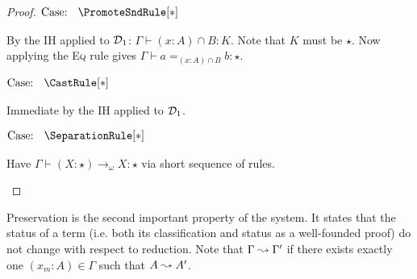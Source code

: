 \begin{proof}
    $\text{Case: }\begin{array}{c} \PromoteSndRule[*] \end{array}$
    \begin{proofcase}
        By the IH applied to $\mathcal{D}_{1}$: $\Gamma \vdash (x : A) \cap B : K$.
        Note that $K$ must be $\star$.
        Now applying the \textsc{Eq} rule gives $\Gamma \vdash a =_{(x : A) \cap B} b : \star$.
    \end{proofcase}

    $\text{Case: }\begin{array}{c} \CastRule[*] \end{array}$
    \begin{proofcase}
        Immediate by the IH applied to $\mathcal{D}_{1}$.
    \end{proofcase}

    $\text{Case: }\begin{array}{c} \SeparationRule[*] \end{array}$
    \begin{proofcase}
        Have $\Gamma \vdash (X : \star) \to_\omega X : \star$ via short sequence of rules.
    \end{proofcase}
\end{proof}

Preservation is the second important property of the system.
It states that the status of a term (i.e. both its classification and status as a well-founded proof) do not change with respect to reduction.
Note that $\Gamma \leadsto \Gamma^\prime$ if there exists exactly one $(x_m : A) \in \Gamma$ such that $A \leadsto A^\prime$.

